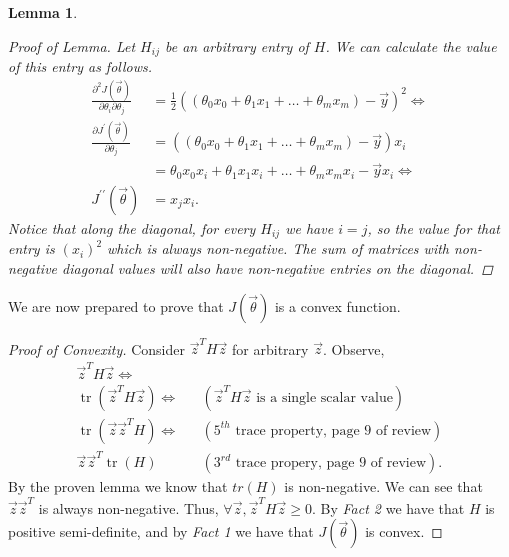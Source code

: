 \documentclass[12pt]{article}
\newtheorem*{lemma}{Lemma}
\DeclareMathOperator{\Tr}{tr}
\begin{document}
\begin{enumerate}
\begin{lemma}
\begin{proof}[Proof of Lemma]
  	Let $H_{ij}$ be an arbitrary entry of $H$. We can calculate the value of this entry as follows.
    \begin{align*}
    \frac{\partial^2J(\vec{\theta})}{\partial\theta_i\partial\theta_j} &= \frac{1}{2}\left( (\theta_0x_0 + \theta_1x_1 + \dots + \theta_mx_m) - \vec{y} \right)^2 \Longleftrightarrow \\
    \frac{\partial J^\prime(\vec{\theta})}{\partial\theta_j} &= \left( (\theta_0x_0 + \theta_1x_1 + \dots + \theta_mx_m) - \vec{y} \right)x_i \\ 
    &= \theta_0x_0x_i + \theta_1x_1x_i + \dots + \theta_mx_mx_i - \vec{y}x_i  \Longleftrightarrow \\
    J^{\prime\prime}(\vec{\theta}) &= x_jx_i .
    \end{align*}
    Notice that along the diagonal, for every $H_{ij}$ we have $i = j$, so the value for that entry is $(x_i)^2$ which is always non-negative. The sum of matrices with non-negative diagonal values will also have non-negative entries on the diagonal.
    \end{proof}
  
  \end{lemma}
  
  We are now prepared to prove that $J(\vec{\theta})$ is a convex function.
  
  \begin{proof}[Proof of Convexity]
   Consider $\vec{z}^T H \vec{z}$ for arbitrary $\vec{z}$. Observe,
   \begin{align*}
   \vec{z}^T H \vec{z} \Leftrightarrow& & \\
   \Tr(\vec{z}^T H \vec{z}) \Leftrightarrow& & \left(\vec{z}^T H \vec{z} \text{ is a single scalar value} \right) \\
   \Tr(\vec{z}\vec{z}^T H) \Leftrightarrow& & \left( 5^{th} \text{ trace property, page 9 of review} \right) \\
   \vec{z}\vec{z}^T \Tr(H) & & \left( 3^{rd} \text{ trace propery, page 9 of review} \right).
   \end{align*}
   By the proven lemma we know that $tr(H)$ is non-negative. We can see that $\vec{z}\vec{z}^T$ is always non-negative. Thus, $\forall \vec{z}, \vec{z}^T H \vec{z} \geq 0$. By \textit{Fact 2} we have that $H$ is positive semi-definite, and by \textit{Fact 1} we have that $J(\vec{\theta})$ is convex. 
  \end{proof}
  
  
  

\end{enumerate}
\end{document}
